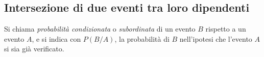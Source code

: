\vspazio\ovalbox{\risolvii \ref{ese:9.47}, \ref{ese:9.48}, \ref{ese:9.49}, \ref{ese:9.50}, \ref{ese:9.51}, \ref{ese:9.52}, \ref{ese:9.53}, \ref{ese:9.54}, \ref{ese:9.55}, \ref{ese:9.56}, \ref{ese:9.57},}

\ovalbox{\ref{ese:9.58}, \ref{ese:9.59}}

\subsection{Intersezione di due eventi tra loro dipendenti}

\begin{definizione}
Si chiama \emph{probabilità condizionata} o \emph{subordinata} di un evento $B$ rispetto a un evento $A$, e si indica con $P(B/A)$, la probabilità di $B$ nell'ipotesi che l'evento $A$ si sia già verificato.
\end{definizione}

